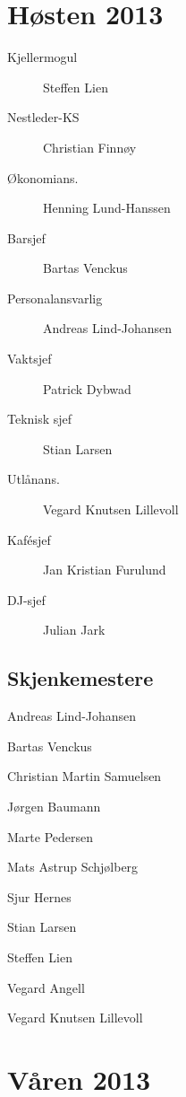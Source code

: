 \section*{Høsten 2013}

\begin{description}
	\item[Kjellermogul] Steffen Lien
	\item[Nestleder-KS] Christian Finnøy
	\item[Økonomians.] Henning Lund-Hanssen
	\item[Barsjef] Bartas Venckus
	\item[Personalansvarlig] Andreas Lind-Johansen
	\item[Vaktsjef] Patrick Dybwad
	\item[Teknisk sjef] Stian Larsen
	\item[Utlånans.] Vegard Knutsen Lillevoll
	\item[Kafésjef] Jan Kristian Furulund
	\item[DJ-sjef] Julian Jark
\end{description}

\subsection*{Skjenkemestere}

\begin{description}
	\item Andreas Lind-Johansen
	\item Bartas Venckus
	\item Christian Martin Samuelsen
	\item Jørgen Baumann
	\item Marte Pedersen
	\item Mats Astrup Schjølberg
	\item Sjur Hernes
	\item Stian Larsen
	\item Steffen Lien
	\item Vegard Angell
	\item Vegard Knutsen Lillevoll
\end{description}

\section*{Våren 2013}

